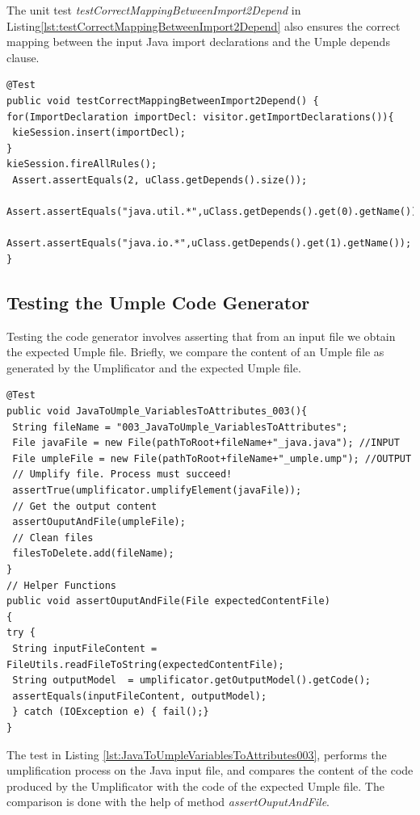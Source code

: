 The unit test \textit{testCorrectMappingBetweenImport2Depend} in Listing\ref{lst:testCorrectMappingBetweenImport2Depend} also ensures the correct mapping between the input Java import declarations and the Umple depends clause.

\begin{lstlisting}[style=java, label=lst:testCorrectMappingBetweenImport2Depend, caption=Test asserting mappings of imports and depends]
@Test
public void testCorrectMappingBetweenImport2Depend() {
for(ImportDeclaration importDecl: visitor.getImportDeclarations()){
 kieSession.insert(importDecl);
}
kieSession.fireAllRules();
 Assert.assertEquals(2, uClass.getDepends().size());
 Assert.assertEquals("java.util.*",uClass.getDepends().get(0).getName());
 Assert.assertEquals("java.io.*",uClass.getDepends().get(1).getName());
}
\end{lstlisting}

\subsection{Testing the Umple Code Generator}

Testing the code generator involves asserting that from an input file we obtain the expected Umple file. Briefly, we compare the content of an Umple file as generated by the Umplificator and the expected Umple file. 

\begin{lstlisting}[style=java, label=lst:JavaToUmpleVariablesToAttributes003, caption=A code generator test]
@Test
public void JavaToUmple_VariablesToAttributes_003(){
 String fileName = "003_JavaToUmple_VariablesToAttributes";
 File javaFile = new File(pathToRoot+fileName+"_java.java"); //INPUT
 File umpleFile = new File(pathToRoot+fileName+"_umple.ump"); //OUTPUT
 // Umplify file. Process must succeed!
 assertTrue(umplificator.umplifyElement(javaFile));
 // Get the output content
 assertOuputAndFile(umpleFile);
 // Clean files 
 filesToDelete.add(fileName);
}
// Helper Functions
public void assertOuputAndFile(File expectedContentFile)
{
try {
 String inputFileContent = FileUtils.readFileToString(expectedContentFile);
 String outputModel  = umplificator.getOutputModel().getCode();
 assertEquals(inputFileContent, outputModel);
 } catch (IOException e) { fail();}
}
\end{lstlisting}

The test in Listing \ref{lst:JavaToUmpleVariablesToAttributes003}, performs the umplification process on the Java input file, and compares the content of the code produced by the Umplificator with the code of the expected Umple file. The comparison is done with the help of method \textit{assertOuputAndFile}.

